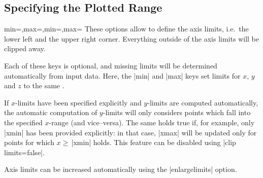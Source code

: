 

\subsection{Specifying the Plotted Range}

\begin{pgfplotsxykeylist}{\x min=,\x max=,min=,max=}
These options allow to define the axis limits, i.e.\ the lower left and the upper right corner. Everything outside of the axis limits will be clipped away.

Each of these keys is optional, and missing limits will be determined automatically from input data. Here, the |min| and |max| keys set limits for $x$, $y$ and $z$ to the same .

If $x$-limits have been specified explicitly and $y$-limits are computed automatically, the automatic computation of $y$-limits will only considers points which fall into the specified $x$-range (and vice--versa). The same holds true if, for example, only |xmin| has been provided explicitly: in that case, |xmax| will be updated only for points for which $x \ge \,$|xmin| holds. This feature can be disabled using |clip limits=false|. 

Axis limits can be increased automatically using the |enlargelimits| option.
\begin{codeexample}[]
\end{codeexample}

\begin{codeexample}[]
\end{codeexample}

\begin{codeexample}[]
\end{codeexample}


\end{pgfplotsxykeylist}
